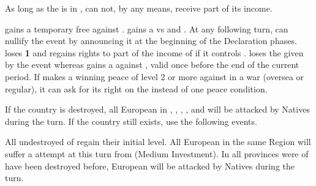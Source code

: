 
\phevnt
\aparag As long as the  is in \paysEgypte, \TUR can not, by
any means, receive part of its income.

\phdipl
\aparag \TUR gains a temporary free \OCB against \VEN.
\aparag \TUR gains a \CB vs \paysSyria and \paysMamelouks.
\aparag At any following turn, \VEN can nullify the event by announcing it at
the beginning of the Declaration phases.  \VEN loses {\bf 1 } \STAB and \TUR
regains rights to part of the income of  if it controls
\paysdamas. \TUR loses the \CB given by the event whereas \VEN gains a \CB
against \TUR, valid once before the end of the current period.
\aparag If \TUR makes a winning peace of level 2 or more against \VEN in a war
(oversea or regular), it can ask for its right on the 
instead of one peace condition.





\condition{}
\aparag If the country \paysGujerat is destroyed, all European \TP in
\granderegionGujarat, \granderegionMalacca, \granderegionSumatra,
\granderegionJava, and  will be attacked by
Natives during the turn.
\aparag If the country \paysGujerat still exists, use the following events.

\phevnt
\aparag All undestroyed \TP of \paysGujerat regain their initial level.  All
European \TP in the same Region will suffer a \CONC attempt at this turn from
\paysGujerat (Medium Investment).
\aparag In all provinces were \TP of \paysGujerat have been destroyed before,
European \TP will be attacked by Natives during the turn.





